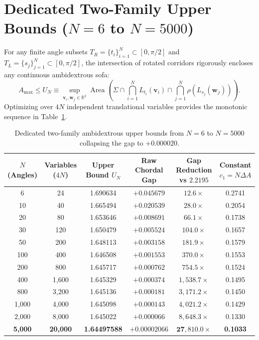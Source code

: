 \documentclass[11pt]{article}
\begin{document}
\section{Dedicated Two-Family Upper Bounds ($N=6$ to $N=5000$)}
For any finite angle subsets $T_R = \{t_i\}_{i=1}^N \subset [0, \pi/2]$ and $T_L = \{s_j\}_{j=1}^N \subset [0, \pi/2]$, the intersection of rotated corridors rigorously encloses any continuous ambidextrous sofa:
\begin{equation}
A_{\max} \le U_N \equiv \sup_{\mathbf{v}_i, \mathbf{w}_j \in \mathbb{R}^2} \operatorname{Area}\left(\Sigma \cap \bigcap_{i=1}^N L_{t_i}(\mathbf{v}_i) \cap \bigcap_{j=1}^N \rho(L_{s_j}(\mathbf{w}_j))\right).
\end{equation}
Optimizing over $4N$ independent translational variables provides the monotonic sequence in Table~\ref{tab:upper_bounds}.

\begin{table}[h]
\centering
\small
\begin{tabular}{cccccc}
\toprule
$N$ (Angles) & Variables ($4N$) & Upper Bound $U_N$ & Raw Chordal Gap & Gap Reduction vs $2.2195$ & Constant $c_1 = N \Delta A$ \\
\midrule
6     & 24     & 1.690634   & $+0.045679$   & $12.6\times$      & 0.2741 \\
10    & 40     & 1.665494   & $+0.020539$   & $28.0\times$      & 0.2054 \\
20    & 80     & 1.653646   & $+0.008691$   & $66.1\times$      & 0.1738 \\
30    & 120    & 1.650479   & $+0.005524$   & $104.0\times$     & 0.1657 \\
50    & 200    & 1.648113   & $+0.003158$   & $181.9\times$     & 0.1579 \\
100   & 400    & 1.646508   & $+0.001553$   & $370.0\times$     & 0.1553 \\
200   & 800    & 1.645717   & $+0.000762$   & $754.5\times$     & 0.1524 \\
400   & 1,600  & 1.645329   & $+0.000374$   & $1,538.7\times$   & 0.1495 \\
800   & 3,200  & 1.645136   & $+0.000181$   & $3,171.2\times$   & 0.1450 \\
1,000 & 4,000  & 1.645098   & $+0.000143$   & $4,021.2\times$   & 0.1429 \\
2,000 & 8,000  & 1.645022   & $+0.000066$   & $8,648.3\times$   & 0.1330 \\
\textbf{5,000} & \textbf{20,000} & \textbf{1.64497588} & $\mathbf{+0.00002066}$ & $\mathbf{27,810.0\times}$ & \textbf{0.1033} \\
\bottomrule
\end{tabular}
\caption{Dedicated two-family ambidextrous upper bounds from $N=6$ to $N=5000$ collapsing the gap to $+0.000020$.}
\label{tab:upper_bounds}
\end{table}
\end{document}
